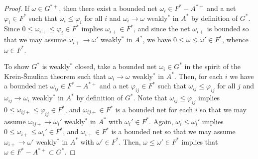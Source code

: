 \documentclass[noamsfonts,a4paper,10pt]{amsart}
\theoremstyle{plain}
\theoremstyle{definition}
\theoremstyle{remark}
\begin{document}
\begin{proof}
If $\omega\in G^{*+}$, then there exist a bounded net $\omega_i\in F^*-A^{*+}$ and a net $\varphi_i\in F^*$ such that $\omega_i\le\varphi_i$ for all $i$ and $\omega_i\to\omega$ weakly$^*$ in $A^*$ by definition of $G^*$.
Since $0\le\omega_{i+}\le\varphi_i\in F^*$ implies $\omega_{i+}\in F^*$, and since the net $\omega_{i+}$ is bounded so that we may assume $\omega_{i+}\to\omega'$ weakly$^*$ in $A^*$, we have $0\le\omega\le\omega'\in F^*$, whence $\omega\in F^*$.

To show $G^*$ is weakly$^*$ closed, take a bounded net $\omega_i\in G^*$ in the spirit of the Krein-\v Smulian theorem such that $\omega_i\to\omega$ weakly$^*$ in $A^*$.
Then, for each $i$ we have a bounded net $\omega_{ij}\in F^*-A^{*+}$ and a net $\varphi_{ij}\in F^*$ such that $\omega_{ij}\le\varphi_{ij}$ for all $j$ and $\omega_{ij}\to\omega_i$ weakly$^*$ in $A^*$ by definition of $G^*$.
Note that $\omega_{ij}\le\varphi_{ij}$ implies $0\le\omega_{ij+}\le\varphi_{ij}\in F^*$, and $\omega_{ij+}\in F^*$ is a bounded net for each $i$ so that we may assume $\omega_{ij+}\to\omega_i'$ weakly$^*$ in $A^*$ with $\omega_i'\in F^*$.
Again, $\omega_i\le\omega_i'$ implies $0\le\omega_{i+}\le\omega_i'\in F^*$, and $\omega_{i+}\in F^*$ is a bounded net so that we may assume $\omega_{i+}\to\omega'$ weakly$^*$ in $A^*$ with $\omega'\in F^*$.
Then, $\omega\le\omega'\in F^*$ implies that $\omega\in F^*-A^{*+}\subset G^*$.
\end{proof}



\end{document}
